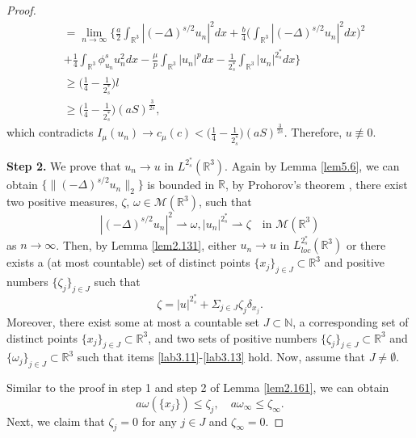 \begin{proof}
\begin{align*}
&= \lim_{n\to \infty}\Big\{\frac{a}{2}\int_{\mathbb{R}^3}|(-\Delta)^{s/2}u_n|^2dx
 +\frac{b}{4}\Big(\int_{\mathbb{R}^3}|(-\Delta)^{s/2}u_n|^2dx\Big)^2 \\
&+ \frac{1}{4}\int_{\mathbb{R}^3}\phi^s_{u_n} u^2_ndx
  -\frac{\mu}{p}\int_{\mathbb{R}^3}|u_n|^pdx
  -\frac{1}{2^*_s}\int_{\mathbb{R}^3}|u_n|^{2^*_s}dx\Big\}\\
&\geq \Big(\frac{1}{4}-\frac{1}{2^*_s}\Big) l \\
&\geq \Big(\frac{1}{4}-\frac{1}{2^*_s}\Big)(aS)^{\frac{3}{2s}},
\end{align*}
which contradicts $I_\mu(u_n)\to c_\mu(c)
<\Big(\frac{1}{4}-\frac{1}{2^*_s}\Big)(aS)^{\frac{3}{2s}}$. 
Therefore, $u\not \equiv 0$.
\smallskip

\noindent\textbf{Step 2.} 
We prove that $u_n\to u$ in $L^{2^*_s}(\mathbb{R}^3)$.
Again by Lemma \ref{lem5.6}, we can obtain 
$\{\|(-\Delta)^{s/2}u_n\|_2\}$ is bounded in $\mathbb{R}$, by Prohorov's theorem 
\cite{P9899}, there exist two positive measures, $\zeta$,
 $\omega\in \mathcal{M}(\mathbb{R}^3)$, such that
\[ 
|(-\Delta)^{s/2}u_n|^2\rightharpoonup \omega, |u_n|^{2^*_s}\rightharpoonup\zeta \quad
\text{in } \mathcal{M}(\mathbb{R}^3)
\]
as $n\to \infty$. Then, by Lemma \ref{lem2.131}, either $u_n\to u$ in
$L^{2^*_s}_{loc}(\mathbb{R}^3)$ or there exists a (at most countable) set of distinct
points $\{x_j\}_{j\in J}\subset \mathbb{R}^3$ and positive numbers $\{\zeta_j\}_{j\in J}$ such that
$$
\zeta=|u|^{2^*_s}+\Sigma_{j\in J}\zeta_j \delta_{x_j}.
$$
Moreover, there exist some at most a countable set $J\subset \mathbb{N}$,
a corresponding set of distinct points $\{x_j\}_{j\in J}\subset \mathbb{R}^3$,
and two sets of positive numbers  $\{\zeta_j\}_{j\in J}\subset \mathbb{R}^3$ and
$\{\omega_j\}_{j\in J}\subset \mathbb{R}^3$ such that items
\eqref{lab3.11}-\eqref{lab3.13} hold. Now, assume that $J\neq \emptyset$.

 Similar to the proof in step 1 and step 2 of Lemma \ref{lem2.161},  we  
 can obtain
 \begin{equation}\label{4.1667}
 a\omega(\{x_j\})\leq\zeta_j,  \quad a\omega_\infty\leq\zeta_\infty.
 \end{equation}
Next, we claim that  $\zeta_j=0$ for any $j\in J$ and $\zeta_\infty=0$.


\end{proof}
